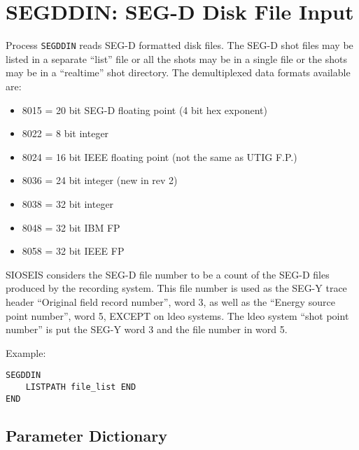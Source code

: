 \section{SEGDDIN: SEG-D Disk File Input}
\label{cmd_segddin}

Process \texttt{SEGDDIN} reads SEG-D formatted disk files.  The SEG-D
shot files may be listed in a separate ``list'' file or all the \glspl{shot}
may be in a single file or the \glspl{shot} may be in a ``realtime'' \gls{shot}
directory.
      The demultiplexed data formats available are:
\begin{itemize}
\item 8015 = 20 bit SEG-D floating point (4 bit hex exponent)
\item 8022 = 8 bit integer
\item 8024 = 16 bit IEEE floating point (not the same as UTIG F.P.)
\item 8036 = 24 bit integer (new in rev 2)
\item 8038 = 32 bit integer
\item 8048 = 32 bit IBM FP
\item 8058 = 32 bit IEEE FP
\end{itemize}

SIOSEIS considers the SEG-D file number to be a count of the
SEG-D files produced by the recording system.  This file number is
used as the SEG-Y trace header ``Original field record number'', word 3,
as well as the ``Energy source point number'', word 5, EXCEPT on \gls{ldeo}
systems.  The \gls{ldeo} system ``shot point number'' is put the SEG-Y word 3
and the file number in word 5.

Example:
\begin{verbatim}
SEGDDIN
    LISTPATH file_list END
END
\end{verbatim}

\subsection{Parameter Dictionary}

